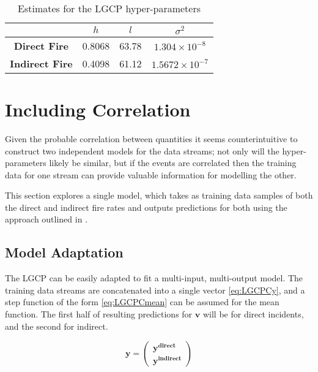 \documentclass[a4paper,11pt]{report}
\begin{document}
\singlespacing
\begin{table}[]
\centering
\caption{Estimates for the LGCP hyper-parameters}
\label{LGCPhyperparameters}
\begin{tabular}{c|c|c|c|}
\cline{2-4}
\textbf{}                                    & \(h\) & \(l\) & \(\sigma^2\) \\ \hline
\multicolumn{1}{|c|}{\textbf{Direct Fire}}   & 0.8068          & 63.78          & \(1.304\times 10^{-8}\)              \\ \hline
\multicolumn{1}{|c|}{\textbf{Indirect Fire}} & 0.4098          & 61.12          & \(1.5672\times 10^{-7}\)              \\ \hline
\end{tabular}
\end{table}
\doublespacing

\section{Including Correlation}


Given the probable correlation between quantities it seems counterintuitive to construct two independent models for the data streams; not only will the hyper-parameters likely be similar, but if the events are correlated then the training data for one stream can provide valuable information for modelling the other.\par

This section explores a single model, which takes as training data samples of both the direct and indirect fire rates and outputs predictions for both using the approach outlined in \cite{multi-outputGP}.

\subsection{Model Adaptation}

The LGCP can be easily adapted to fit a multi-input, multi-output model. The training data streams are concatenated into a single vector \ref{eq:LGCPCy}, and a step function of the form \ref{eq:LGCPCmean} can be assumed for the mean function. The first half of resulting predictions for \(\mathbf{v}\) will be for direct incidents, and the second for indirect.

\begin{equation} \label{eq:LGCPCy}
\mathbf{y} = \left( \begin{array}{cc}
\mathbf{y^{direct}} \\
\mathbf{y^{indirect}} \end{array} \right)
\end{equation}
\end{document}
